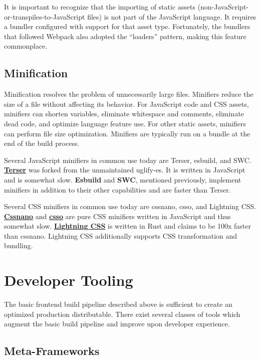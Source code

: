 \documentclass{article}
\newcommand{\tb}{\textbf}
\begin{document}
It is important to recognize that the importing of static assets
(non-JavaScript-or-transpiles-to-JavaScript files) is not part of the JavaScript language. It
requires a bundler configured with support for that asset type. Fortunately, the bundlers that
followed Webpack also adopted the ``loaders'' pattern, making this feature commonplace.

\subsection{Minification}

Minification resolves the problem of unnecessarily large files. Minifiers reduce the size of a file
without affecting its behavior. For JavaScript code and CSS assets, minifiers can shorten variables,
eliminate whitespace and comments, eliminate dead code, and optimize language feature use. For other
static assets, minifiers can perform file size optimization. Minifiers are typically run on a bundle
at the end of the build process.

Several JavaScript minifiers in common use today are Terser, esbuild, and SWC.
\href{https://terser.org/}{\tb{Terser}} was forked from the unmaintained uglify-es. It is written in
JavaScript and is somewhat slow. \tb{Esbuild} and \textbf{SWC}, mentioned previously, implement
minifiers in addition to their other capabilities and are faster than Terser.

Several CSS minifiers in common use today are cssnano, csso, and Lightning CSS.
\href{https://cssnano.github.io/cssnano/}{\tb{Cssnano}} and
\href{https://github.com/css/csso}{\tb{csso}} are pure CSS minifiers written in JavaScript and thus
somewhat slow. \href{https://lightningcss.dev/}{\tb{Lightning CSS}} is written in Rust and claims to
be 100x faster than cssnano. Lightning CSS additionally supports CSS transformation and bundling.

\section{Developer Tooling}

The basic frontend build pipeline described above is sufficient to create an optimized production
distributable. There exist several classes of tools which augment the basic build pipeline and
improve upon developer experience.

\subsection{Meta-Frameworks}
\end{document}
